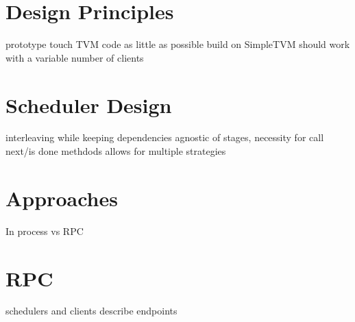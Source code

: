 \section{Design Principles}
prototype
touch TVM code as little as possible
build on SimpleTVM
should work with a variable number of clients
\section{Scheduler Design}
interleaving while keeping dependencies
agnostic of stages, necessity for call next/is done methdods
allows for multiple strategies
\section{Approaches}
In process vs RPC
\section{RPC}
schedulers and clients
describe endpoints